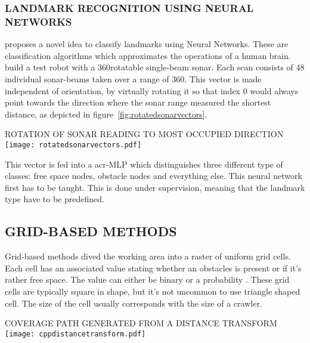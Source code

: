 \subsubsection{LANDMARK RECOGNITION USING NEURAL NETWORKS}
\citet{wong_qualitative_2006} proposes a novel idea to classify landmarks using Neural Networks. These are
classification algorithms which approximates the operations of a human brain. \citeauthor{wong_qualitative_2006} build a
test robot with a 360\textdegree rotatable single-beam sonar. Each scan consists of 48 individual sonar-beams taken over
a range of 360\textdegree. This vector is made independent of orientation, by virtually rotating it so that index 0
would always point towards the direction where the sonar range measured the shortest distance, as depicted in
figure~\ref{fig:rotatedsonarvectors}.

\begin{RoyalFigure}[!htb, label=fig:rotatedsonarvectors]{ROTATION OF SONAR READING TO MOST OCCUPIED 
DIRECTION~\cite{wong_qualitative_2006}}
    \texttt{[image: rotatedsonarvectors.pdf]}
\end{RoyalFigure}

This vector is fed into a \gls{acr-MLP} which distinguishes three different type of classes: free space nodes,
obstacle nodes and everything else. This neural network first has to be taught. This is done under supervision, meaning
that the landmark type have to be predefined.

\subsection{GRID-BASED METHODS}
Grid-based methods dived the working area into a raster of uniform grid cells. Each cell has an associated value stating
whether an obstacles is present or if it's rather free space. The value can either be binary or a probability
\cite{galceran_coverage_2014}. These grid cells are typically square in shape, but it's not uncommon to use triangle
shaped cell. The size of the cell usually corresponds with the size of a crawler.

\begin{RoyalFigure}[!htb, label=fig:ccpdistancetransform]{COVERAGE PATH GENERATED FROM A DISTANCE 
TRANSFORM~\cite{wong_qualitative_2006}}
    \texttt{[image: cppdistancetransform.pdf]}
\end{RoyalFigure}

